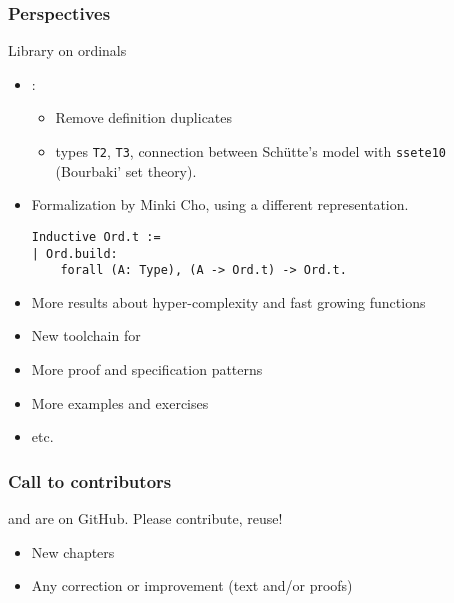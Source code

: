 \documentclass[10pt, fleqn]{beamer}
\begin{document}

\begin{frame}[fragile]
  \frametitle{Perspectives}
  \begin{block}{Library on ordinals}
      \begin{itemize}
  \item \gaiahydra:
    \begin{itemize}
    \item Remove definition duplicates
     \item types \texttt{T2}, \texttt{T3}, connection between 
    Schütte's model with \texttt{ssete10} (Bourbaki' set theory).
    \end{itemize}
    
  
    \item Formalization by Minki Cho, using a different representation.
{\color{darkorange}
\begin{verbatim}
Inductive Ord.t :=
| Ord.build: 
    forall (A: Type), (A -> Ord.t) -> Ord.t.
\end{verbatim}
}  
    \end{itemize}

  \end{block}
\end{frame}





\begin{frame}
  \begin{block}{}
    \begin{itemize}
      \item More results about hyper-complexity and fast growing functions
    \item New toolchain for \alectr
    \item More proof and specification patterns
    \item More examples and exercises
    \item etc.
    \end{itemize}
  \end{block}
\end{frame}

  \begin{frame}
\frametitle{Call to contributors}
  \begin{block}{}
  {\color{plugincolor}\Hydras} and  {\color{plugincolor}\community} are on GitHub. {\color{cyan}Please contribute, reuse!}
      \begin{itemize}
      \item New chapters
      \item Any correction or improvement (text and/or proofs)
        
  
    \end{itemize}
     \end{block}
 
  
\end{frame}
\end{document}
